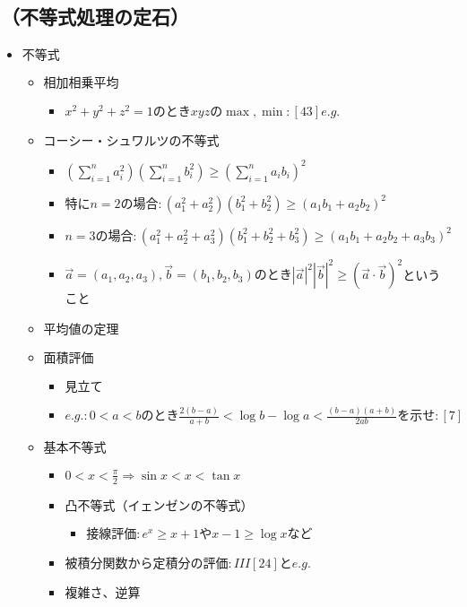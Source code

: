 \documentclass[dvipdfmx,uplatex]{jsarticle}
\begin{document}
\subsection{（不等式処理の定石）}
\begin{itemize}
	\item $ 不等式$
	\begin{itemize}
		\item $ 相加相乗平均$
		\begin{itemize}
			\item $x^2+y^2+z^2=1のときxyzの \max , \min :[43]e.g.$
		\end{itemize}
		\item $ コーシー・シュワルツの不等式$
		\begin{itemize}
			\item ${\displaystyle \left( \sum_{i=1}^n a_i^2 \right)}{\displaystyle \left( \sum_{i=1}^n b_i^2 \right)}\geq{\displaystyle \left( \sum_{i=1}^n a_ib_i \right)^2}$
			\item $特に n=2 の場合:(a_1^2+a_2^2)(b_1^2+b_2^2)\geq(a_1b_1+a_2b_2)^2$
			\item $n=3 の場合:(a_1^2+a_2^2+a_3^2)(b_1^2+b_2^2+b_3^2)\geq(a_1b_1+a_2b_2+a_3b_3)^2$
			\item $\overrightarrow{a}=(a_1,a_2,a_3), \overrightarrow{b}=(b_1,b_2,b_3)のとき|\overrightarrow{a}|^2|\overrightarrow{b}|^2\geq(\overrightarrow{a}\cdot\overrightarrow{b})^2$ということ
		\end{itemize}
		\item $ 平均値の定理$
		\item $ 面積評価$
		\begin{itemize}
			\item $ 見立て$
			\item $e.g.:0<a<bのとき\frac{2(b-a)}{a+b}< \log b - \log a < \frac{(b-a)(a+b)}{2ab}を示せ:[7]$
		\end{itemize}
		\item $ 基本不等式$
		\begin{itemize}
			\item $ 0 < x < \frac{ \pi }{2} \Rightarrow \sin x < x < \tan x$
			\item $ 凸不等式（イェンゼンの不等式）$
			\begin{itemize}
				\item $ 接線評価:e^x \geq x+1$や$x-1 \geq \log x$など
			\end{itemize}
			\item $ 被積分関数から定積分の評価:III[24]とe.g.$
			\item 複雑さ、逆算

\end{itemize}
\end{itemize}
\end{itemize}
\end{document}
